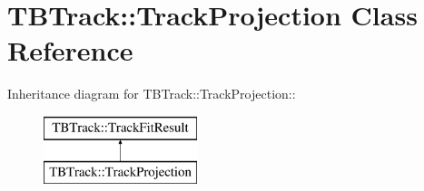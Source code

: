 \section{TBTrack::TrackProjection Class Reference}
\label{classTBTrack_1_1TrackProjection}
Inheritance diagram for TBTrack::TrackProjection::\begin{figure}[H]
\begin{center}
\leavevmode
\includegraphics[height=2cm]{classTBTrack_1_1TrackProjection}
\end{center}
\end{figure}
